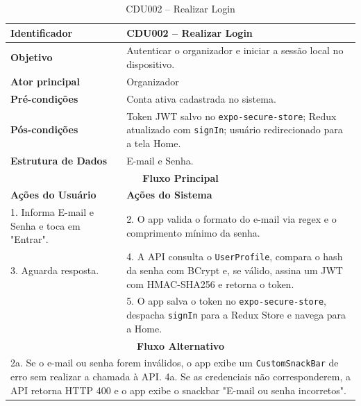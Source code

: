 \begin{table}[htbp]
\centering
\caption{CDU002 – Realizar Login}
\begin{tabular}{|p{4cm}|p{11cm}|}
\hline
\textbf{Identificador} & CDU002 – Realizar Login \\ \hline
\textbf{Objetivo} & Autenticar o organizador e iniciar a sessão local no dispositivo. \\ \hline
\textbf{Ator principal} & Organizador \\ \hline
\textbf{Pré-condições} & Conta ativa cadastrada no sistema. \\ \hline
\textbf{Pós-condições} & Token JWT salvo no \texttt{expo-secure-store}; Redux atualizado com \texttt{signIn}; usuário redirecionado para a tela Home. \\ \hline
\textbf{Estrutura de Dados} & E-mail e Senha. \\ \hline
\multicolumn{2}{|c|}{\textbf{Fluxo Principal}} \\ \hline
\textbf{Ações do Usuário} & \textbf{Ações do Sistema} \\ \hline
1. Informa E-mail e Senha e toca em "Entrar". & 2. O app valida o formato do e-mail via regex e o comprimento mínimo da senha. \\ \hline
3. Aguarda resposta. & 4. A API consulta o \texttt{UserProfile}, compara o hash da senha com BCrypt e, se válido, assina um JWT com HMAC-SHA256 e retorna o token. \\ \hline
 & 5. O app salva o token no \texttt{expo-secure-store}, despacha \texttt{signIn} para a Redux Store e navega para a Home. \\ \hline
\multicolumn{2}{|c|}{\textbf{Fluxo Alternativo}} \\ \hline
\multicolumn{2}{|p{15cm}|}{2a. Se o e-mail ou senha forem inválidos, o app exibe um \texttt{CustomSnackBar} de erro sem realizar a chamada à API. 4a. Se as credenciais não corresponderem, a API retorna HTTP 400 e o app exibe o snackbar "E-mail ou senha incorretos".} \\ \hline
\end{tabular}
\end{table}

